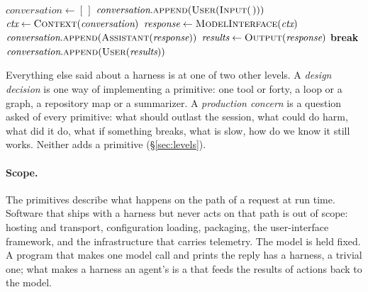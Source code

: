 \begin{algorithm}[t]
\caption{A harness. Lines are labelled with the primitive they implement.}
\label{alg:harness}
\small
\begin{algorithmic}[1]
  \State $\textit{conversation} \gets [\,]$
  \Loop {}
    \State $\textit{conversation}.\textsc{append}(\textsc{User}(\Call{Input}{\,}))$ 
    \Loop {}
      \State $\textit{ctx} \gets \Call{Context}{\textit{conversation}}$ 
      \State $\textit{response} \gets \Call{ModelInterface}{\textit{ctx}}$ 
      \State $\textit{conversation}.\textsc{append}(\textsc{Assistant}(\textit{response}))$
      \State $\textit{results} \gets \Call{Output}{\textit{response}}$ 
       \textbf{break} 
      \EndIf
      \State $\textit{conversation}.\textsc{append}(\textsc{User}(\textit{results}))$ 
    \EndLoop
  \EndLoop
\EndProcedure
\end{algorithmic}
\end{algorithm}

Everything else said about a harness is at one of two other levels. A \emph{design decision} is one way of implementing a primitive: one tool or forty, a loop or a graph, a repository map or a summarizer. A \emph{production concern} is a question asked of every primitive: what should outlast the session, what could do harm, what did it do, what if something breaks, what is slow, how do we know it still works. Neither adds a primitive (\S\ref{sec:levels}).

\paragraph{Scope.} The primitives describe what happens on the path of a request at run time. Software that ships with a harness but never acts on that path is out of scope: hosting and transport, configuration loading, packaging, the user-interface framework, and the infrastructure that carries telemetry. The model is held fixed. A program that makes one model call and prints the reply has a harness, a trivial one; what makes a harness an agent's is a  that feeds the results of actions back to the model.

